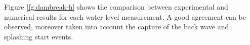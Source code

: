Figure \ref{fg:dambreak-h} shows the comparison between experimental and numerical results for each water-level measurement. A good agreement can be observed, \textcolor[rgb]{1.00,0.00,0.00}{moreover taken into account} the capture of the back wave and splashing start events.
  \begin{figure}[h]
  \centering
     \\
\end{figure}
